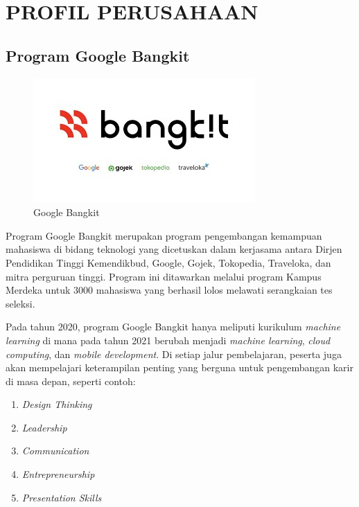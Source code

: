 \chapter{PROFIL PERUSAHAAN}


\section{Program Google Bangkit}

\begin{figure} [ht] \centering
  \includegraphics[scale=0.7]{gambar/bangkit.jpg}
  \caption{Google Bangkit \cite{logo}}
  \label{fig:OrganizationStructure}
\end{figure}

Program Google Bangkit \cite{bangkit} merupakan program pengembangan kemampuan mahasiswa di bidang teknologi yang dicetuskan dalam kerjasama antara Dirjen Pendidikan Tinggi Kemendikbud, Google, Gojek, Tokopedia, Traveloka, dan mitra perguruan tinggi.
Program ini ditawarkan melalui program Kampus Merdeka untuk 3000 mahasiswa yang berhasil lolos melawati serangkaian tes seleksi.

Pada tahun 2020, program Google Bangkit hanya meliputi kurikulum \textit{machine learning} di mana pada tahun 2021 berubah menjadi \textit{machine learning}, \textit{cloud computing}, dan \textit{mobile development}.
Di setiap jalur pembelajaran, peserta juga akan mempelajari keterampilan penting yang berguna untuk pengembangan karir di masa depan, seperti contoh:

  \begin{enumerate}[nolistsep]
    
    \item \textit{Design Thinking}
    
    \item \textit{Leadership}
    
    \item \textit{Communication}
    
    \item \textit{Entrepreneurship}
    
    \item \textit{Presentation Skills}
  
  \end{enumerate}

